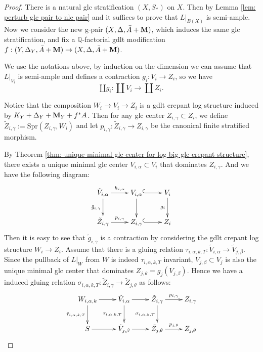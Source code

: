 \documentclass[11pt]{amsart}
\numberwithin{equation}{section}
\newcommand{\Mm}{{\bf{M}}}
\newcommand{\Spr}{\mathrm{Spr}}
\newcommand{\Qq}{\mathbb{Q}}
\theoremstyle{definition}
\theoremstyle{definition}
\theoremstyle{definition}
\begin{document}
\begin{proof}
There is a natural glc stratification $(X,S_*)$ on $X$. Then by Lemma \ref{lem: perturb glc pair to nlc pair} and \cite[Theorem 13.1]{Fuj11} it suffices to prove that $L|_{B(X)}$ is semi-ample. Now we consider the new g-pair $(X,\Delta,\bar{A}+\Mm)$, which induces the same glc stratification, and fix a $\Qq$-factorial gdlt modification $f:(Y,\Delta_Y,\bar{A}+\Mm)\to(X,\Delta,\bar{A}+\Mm)$. 

We use the notations above, by induction on the dimension we can assume that $L|_{V_i}$ is semi-ample and defines a contraction $g_i:V_i\to Z_i$, so we have
$$
\amalg g_i: \coprod V_i\to\coprod Z_i.
$$

Notice that the composition $W_i\to V_i\to Z_i$ is a gdlt crepant log structure induced by $K_Y+\Delta_Y+\Mm_Y+f^*A$. Then for any glc center $Z_{i,\gamma}\subset Z_i$, we define $\tilde{Z}_{i,\gamma}:=\Spr(Z_{i,\gamma},W_i)$ and let $p_{i,\gamma}:\tilde{Z}_{i,\gamma}\to Z_{i,\gamma}$ be the canonical finite stratified morphism. 

By Theorem \ref{thm: unique minimal glc center for log big glc crepant structure}, there exists a unique minimal glc center $V_{i,\alpha}\subset V_i$ that dominates $Z_{i,\gamma}$. And we have the following diagram:
\begin{displaymath}
    \xymatrix{
        \tilde{V}_{i,\alpha}\ar[r]^{h_{i,\alpha}}\ar[d]_{\tilde{g}_{i,\gamma}}& V_{i,\alpha}\ar@{^(->}[r]\ar[d]& V_i\ar[d]_{g_i} \\
        \tilde{Z}_{i,\gamma} \ar[r]^{p_{i,\gamma}}& Z_{i,\gamma}\ar@{^(->}[r] & Z_i
    }
\end{displaymath}
Then it is easy to see that $\tilde{g}_{i,\gamma}$ is a contraction by considering the gdlt crepant log structure $W_i\to Z_i$. Assume that there is a gluing relation $\tau_{i,\alpha,k,T}:\tilde{V}_{i,\alpha}\to\tilde{V}_{j,\beta}$. Since the pullback of $L|_W$ from $W$ is indeed $\tau_{i,\alpha,k,T}$ invariant, $V_{j,\beta}\subset V_j$ is also the unique minimal glc center that dominates $Z_{j,\theta}=g_j(V_{j,\beta})$. Hence we have a induced gluing relation $\sigma_{i,\alpha,k,T}:\tilde{Z}_{i,\gamma}\to\tilde{Z}_{j,\theta}$ as follows:
\begin{displaymath}
    \xymatrix{
        W_{i,\alpha,k} \ar[r]\ar[d]_{\tilde{\tau}_{i,\alpha,k,T}}& \tilde{V}_{i,\alpha}\ar[r]\ar[d]_{\tau_{i,\alpha,k,T}} & \tilde{Z}_{i,\gamma}\ar[d]_{\sigma_{i,\alpha,k,T}}\ar[r]^{p_{i,\gamma}}&Z_{i,\gamma} \\
        S \ar[r]             & \tilde{V}_{j,\beta}\ar[r] & \tilde{Z}_{j,\theta}\ar[r]^{p_{j,\theta}}& Z_{j,\theta}
    }
\end{displaymath}


\end{proof}
\end{document}
